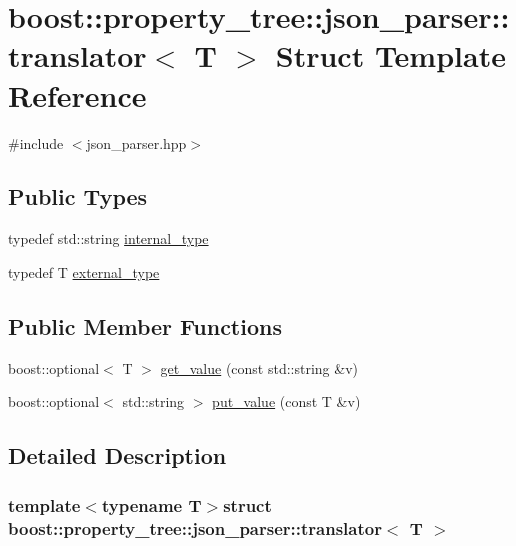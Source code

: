 \hypertarget{structboost_1_1property__tree_1_1json__parser_1_1translator}{\section{boost\-:\-:property\-\_\-tree\-:\-:json\-\_\-parser\-:\-:translator$<$ T $>$ Struct Template Reference}
\label{structboost_1_1property__tree_1_1json__parser_1_1translator}
}


{\ttfamily \#include $<$json\-\_\-parser.\-hpp$>$}

\subsection*{Public Types}
\begin{DoxyCompactItemize}
\item 
typedef std\-::string \hyperlink{structboost_1_1property__tree_1_1json__parser_1_1translator_aa6939259165594c66343c4fd2b92fee0}{internal\-\_\-type}
\item 
typedef T \hyperlink{structboost_1_1property__tree_1_1json__parser_1_1translator_a41e329b10777c2a4a756b65911746a8a}{external\-\_\-type}
\end{DoxyCompactItemize}
\subsection*{Public Member Functions}
\begin{DoxyCompactItemize}
\item 
boost\-::optional$<$ T $>$ \hyperlink{structboost_1_1property__tree_1_1json__parser_1_1translator_aef3c8478be3ecb503113f433ece01628}{get\-\_\-value} (const std\-::string \&v)
\item 
boost\-::optional$<$ std\-::string $>$ \hyperlink{structboost_1_1property__tree_1_1json__parser_1_1translator_aab997fa3043e1decab15845b61a9c801}{put\-\_\-value} (const T \&v)
\end{DoxyCompactItemize}


\subsection{Detailed Description}
\subsubsection*{template$<$typename T$>$struct boost\-::property\-\_\-tree\-::json\-\_\-parser\-::translator$<$ T $>$}



